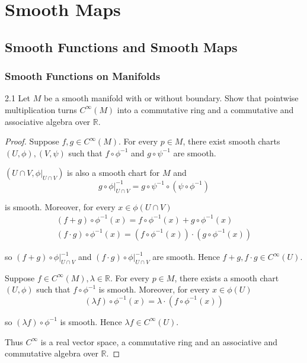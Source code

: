 \chapter{Smooth Maps}

\section{Smooth Functions and Smooth Maps}

\subsection{Smooth Functions on Manifolds}

\begin{exercise}{2.1}
    Let \( M \) be a smooth manifold with or without boundary. Show that pointwise multiplication turns \( C^{\infty}(M) \) into a commutative ring and a commutative and associative algebra over \( \mathbb{R} \).
\end{exercise}

\begin{proof}
    Suppose \( f, g \in C^{\infty}(M) \). For every \( p \in M \), there exist smooth charts \( (U, \phi), (V, \psi) \) such that \( f \circ \phi^{-1} \) and \( g \circ \psi^{-1} \) are smooth.

    \( (U \cap V, \phi\vert_{U \cap V}) \) is also a smooth chart for \( M \) and
    \[
        g \circ \phi\vert_{U \cap V}^{-1} = g \circ \psi^{-1} \circ (\psi \circ \phi^{-1})
    \]

    is smooth. Moreover, for every \( x \in \phi(U \cap V) \)
    \begingroup
    \allowdisplaybreaks%
    \begin{align*}
        (f + g) \circ \phi^{-1}(x) = f \circ \phi^{-1}(x) + g \circ \phi^{-1}(x) \\
        (f \cdot g) \circ \phi^{-1}(x) = (f \circ \phi^{-1}(x)) \cdot (g \circ \phi^{-1}(x))
    \end{align*}
    \endgroup

    so \( (f + g) \circ \phi\vert_{U \cap V}^{-1} \) and \( (f \cdot g) \circ \phi\vert_{U \cap V}^{-1} \) are smooth. Hence \( f + g, f \cdot g \in C^{\infty}(U) \).

    Suppose \( f \in C^{\infty}(M), \lambda \in \mathbb{R} \). For every \( p \in M \), there exists a smooth chart \( (U, \phi) \) such that \( f \circ \phi^{-1} \) is smooth. Moreover, for every \( x \in \phi(U) \)
    \[
        (\lambda f) \circ \phi^{-1}(x) = \lambda \cdot (f \circ \phi^{-1}(x))
    \]

    so \( (\lambda f) \circ \phi^{-1} \) is smooth. Hence \( \lambda f \in C^{\infty}(U) \).

    Thus \( C^{\infty} \) is a real vector space, a commutative ring and an associative and commutative algebra over \( \mathbb{R} \).
\end{proof}

